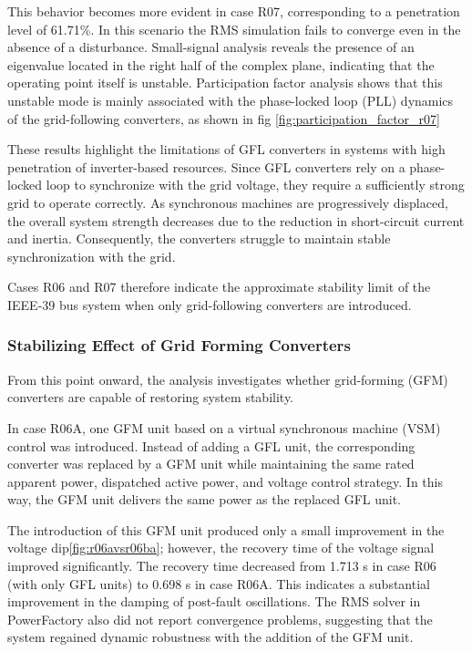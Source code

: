 This behavior becomes more evident in case R07, corresponding to a penetration level of 61.71\%. In this scenario the RMS simulation fails to converge even in the absence of a disturbance. Small-signal analysis reveals the presence of an eigenvalue located in the right half of the complex plane, indicating that the operating point itself is unstable. Participation factor analysis shows that this unstable mode is mainly associated with the phase-locked loop (PLL) dynamics of the grid-following converters, as shown in fig \ref{fig:participation_factor_r07}


These results highlight the limitations of GFL converters in systems with high penetration of inverter-based resources. Since GFL converters rely on a phase-locked loop to synchronize with the grid voltage, they require a sufficiently strong grid to operate correctly. As synchronous machines are progressively displaced, the overall system strength decreases due to the reduction in short-circuit current and inertia. Consequently, the converters struggle to maintain stable synchronization with the grid.

Cases R06 and R07 therefore indicate the approximate stability limit of the IEEE-39 bus system when only grid-following converters are introduced.

\subsubsection{Stabilizing Effect of Grid Forming Converters}

From this point onward, the analysis investigates whether grid-forming (GFM) converters are capable of restoring system stability.

In case R06A, one GFM unit based on a virtual synchronous machine (VSM) control was introduced. Instead of adding a GFL unit, the corresponding converter was replaced by a GFM unit while maintaining the same rated apparent power, dispatched active power, and voltage control strategy. In this way, the GFM unit delivers the same power as the replaced GFL unit.

The introduction of this GFM unit produced only a small improvement in the voltage dip\ref{fig:r06avsr06ba}; however, the recovery time of the voltage signal improved significantly. The recovery time decreased from 1.713 s in case R06 (with only GFL units) to 0.698 s in case R06A. This indicates a substantial improvement in the damping of post-fault oscillations. The RMS solver in PowerFactory also did not report convergence problems, suggesting that the system regained dynamic robustness with the addition of the GFM unit.

